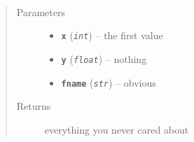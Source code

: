 \documentclass[letterpaper,10pt,english]{sphinxmanual}
\begin{document}

\begin{fulllineitems}
\label{docstring_examples:abc_pack.docstring_examples.google_style}~\begin{quote}\begin{description}
\item[{Parameters}] \leavevmode\begin{itemize}
\item {} 
\textbf{\texttt{x}} (\emph{\texttt{int}}) -- the first value

\item {} 
\textbf{\texttt{y}} (\emph{\texttt{float}}) -- nothing

\item {} 
\textbf{\texttt{fname}} (\emph{\texttt{str}}) -- obvious

\end{itemize}

\item[{Returns}] \leavevmode
everything you never cared about

\end{description}\end{quote}

\end{fulllineitems}

\end{document}
